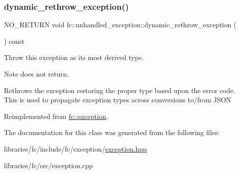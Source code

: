 \subsubsection{\texorpdfstring{dynamic\+\_\+rethrow\+\_\+exception()}{dynamic\_rethrow\_exception()}}
{\footnotesize\ttfamily N\+O\+\_\+\+R\+E\+T\+U\+RN void fc\+::unhandled\+\_\+exception\+::dynamic\+\_\+rethrow\+\_\+exception (\begin{DoxyParamCaption}{ }\end{DoxyParamCaption}) const\hspace{0.3cm}{\ttfamily [virtual]}}

Throw this exception as its most derived type.

\begin{DoxyNote}{Note}
does not return.
\end{DoxyNote}
Rethrows the exception restoring the proper type based upon the error code. This is used to propagate exception types across conversions to/from J\+S\+ON 

Reimplemented from \mbox{\hyperlink{classfc_1_1exception_ace951e3b4efa51ea203b0e111f7e99a2}{fc\+::exception}}.



The documentation for this class was generated from the following files\+:\begin{DoxyCompactItemize}
\item 
libraries/fc/include/fc/exception/\mbox{\hyperlink{exception_8hpp}{exception.\+hpp}}\item 
libraries/fc/src/exception.\+cpp\end{DoxyCompactItemize}
